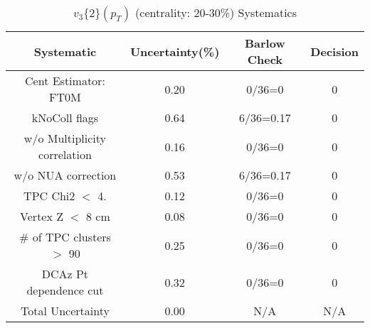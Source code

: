 \begin{table}[htbp]
\caption{$v_3\{2\}(p_{T})$ (centrality: 20-30\%) Systematics}
\label{tab:Sys_pTDiffv3}
\centering
\begin{tabular}{|c|c|c|c|}
\hline
Systematic & Uncertainty(\%) & Barlow Check & Decision \\
\hline
Cent Estimator: FT0M & 0.20 & 0/36=0 & 0 \\
kNoColl flags & 0.64 & 6/36=0.17 & 0 \\
w/o Multiplicity correlation & 0.16 & 0/36=0 & 0 \\
w/o NUA correction & 0.53 & 6/36=0.17 & 0 \\
TPC Chi2 $<$ 4. & 0.12 & 0/36=0 & 0 \\
Vertex Z $<$ 8 cm & 0.08 & 0/36=0 & 0 \\
\# of TPC clusters $>$ 90 & 0.25 & 0/36=0 & 0 \\
DCAz Pt dependence cut & 0.32 & 0/36=0 & 0 \\
\hline
Total Uncertainty & 0.00 & N/A & N/A \\
\hline
\end{tabular}
\end{table}
